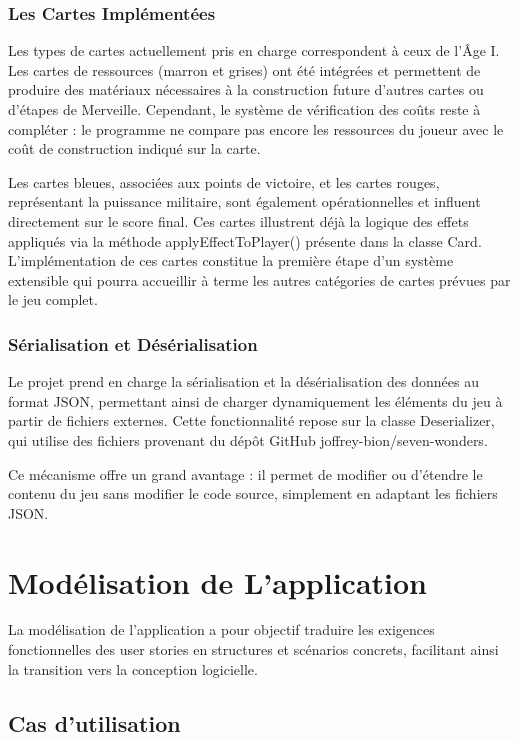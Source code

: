 \subsubsection{Les Cartes Implémentées}
\label{sec:card-types}

Les types de cartes actuellement pris en charge correspondent à ceux de l’Âge I. Les cartes de ressources (marron et grises) ont été intégrées et permettent de produire des matériaux nécessaires à la construction future d’autres cartes ou d’étapes de Merveille. Cependant, le système de vérification des coûts reste à compléter : le programme ne compare pas encore les ressources du joueur avec le coût de construction indiqué sur la carte.

Les cartes bleues, associées aux points de victoire, et les cartes rouges, représentant la puissance militaire, sont également opérationnelles et influent directement sur le score final. Ces cartes illustrent déjà la logique des effets appliqués via la méthode applyEffectToPlayer() présente dans la classe Card. L’implémentation de ces cartes constitue la première étape d’un système extensible qui pourra accueillir à terme les autres catégories de cartes prévues par le jeu complet.

\subsubsection{Sérialisation et Désérialisation}

Le projet prend en charge la sérialisation et la désérialisation des données au format JSON, permettant ainsi de charger dynamiquement les éléments du jeu à partir de fichiers externes. Cette fonctionnalité repose sur la classe Deserializer, qui utilise des fichiers provenant du dépôt GitHub joffrey-bion/seven-wonders.

Ce mécanisme offre un grand avantage : il permet de modifier ou d’étendre le contenu du jeu sans modifier le code source, simplement en adaptant les fichiers JSON.

\section{Modélisation de L'application}
\label{sec:model}

La modélisation de l’application a pour objectif traduire les exigences fonctionnelles des user stories en structures et scénarios concrets, facilitant ainsi la transition vers la conception logicielle.

\subsection{Cas d'utilisation}
\label{sec:diagram-usage}

